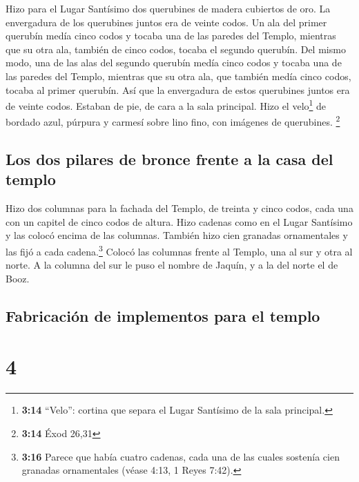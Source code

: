  Hizo para el Lugar Santísimo dos querubines de madera
cubiertos de oro.  La envergadura de los querubines
juntos era de veinte codos. Un ala del primer querubín medía cinco codos
y tocaba una de las paredes del Templo, mientras que su otra ala,
también de cinco codos, tocaba el segundo querubín.  Del
mismo modo, una de las alas del segundo querubín medía cinco codos y
tocaba una de las paredes del Templo, mientras que su otra ala, que
también medía cinco codos, tocaba al primer querubín. 
Así que la envergadura de estos querubines juntos era de veinte codos.
Estaban de pie, de cara a la sala principal.  Hizo el
velo\footnote{\textbf{3:14} ``Velo'': cortina que separa el Lugar
  Santísimo de la sala principal.} de bordado azul, púrpura y carmesí
sobre lino fino, con imágenes de querubines. \footnote{\textbf{3:14}
  Éxod 26,31}

\hypertarget{los-dos-pilares-de-bronce-frente-a-la-casa-del-templo}{%
\subsection{Los dos pilares de bronce frente a la casa del
templo}\label{los-dos-pilares-de-bronce-frente-a-la-casa-del-templo}}

 Hizo dos columnas para la fachada del Templo, de treinta
y cinco codos, cada una con un capitel de cinco codos de altura.
 Hizo cadenas como en el Lugar Santísimo y las colocó
encima de las columnas. También hizo cien granadas ornamentales y las
fijó a cada cadena.\footnote{\textbf{3:16} Parece que había cuatro
  cadenas, cada una de las cuales sostenía cien granadas ornamentales
  (véase 4:13, 1 Reyes 7:42).}  Colocó las columnas
frente al Templo, una al sur y otra al norte. A la columna del sur le
puso el nombre de Jaquín, y a la del norte el de Booz.

\hypertarget{fabricaciuxf3n-de-implementos-para-el-templo}{%
\subsection{Fabricación de implementos para el
templo}\label{fabricaciuxf3n-de-implementos-para-el-templo}}

\hypertarget{section-3}{%
\section{4}\label{section-3}}

